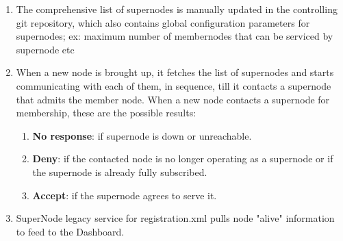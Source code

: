 \documentclass[oneside,12pt]{memoir}
\begin{document}
\begin{enumerate}
\item The comprehensive list of supernodes is manually updated in the controlling git repository, which also contains global configuration parameters for supernodes; ex: maximum number of membernodes that can be serviced by supernode etc
\item When a new node is brought up, it fetches the list of supernodes and starts communicating with each of them, in sequence, till it contacts a supernode that admits the member node. When a new node contacts a supernode for membership, these are the possible results:
\begin{enumerate}
\item \textbf{No response}: if supernode is down or unreachable.
\item \textbf{Deny}: if the contacted node is no longer operating as a supernode or if the supernode is already fully subscribed.
\item \textbf{Accept}: if the supernode agrees to serve it.
\end{enumerate}





\item SuperNode legacy service for registration.xml pulls node "alive" information to feed to the Dashboard.  

\end{enumerate}
\end{document}
